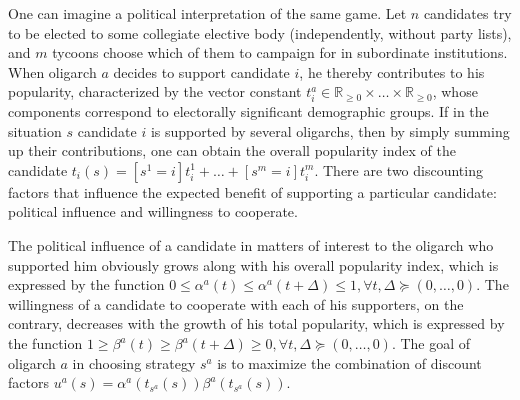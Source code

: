 One can imagine a political interpretation of the same game. Let $n$ candidates try to be elected to some collegiate elective body (independently, without party lists), and $m$ tycoons choose which of them to campaign for in subordinate institutions. When oligarch $a$ decides to support candidate $i$, he thereby contributes to his popularity, characterized by the vector constant $t_i^a \in \mathbb{R}_{\ge 0} \times \ldots \times \mathbb{R}_{\ge 0}$, whose components correspond to electorally significant demographic groups. If in the situation $s$ candidate $i$ is supported by several oligarchs, then by simply summing up their contributions, one can obtain the overall popularity index of the candidate $t_i(s) = [s^1 = i] t_i^1 + \ldots + [s^m = i] t_i^m$. There are two discounting factors that influence the expected benefit of supporting a particular candidate: political influence and willingness to cooperate. %

The political influence of a candidate in matters of interest to the oligarch who supported him obviously grows along with his overall popularity index, which is expressed by the function $0 \le \alpha^a(t) \le \alpha^a(t + \Delta) \le 1, \forall t, \Delta \succeq (0, \ldots, 0)$. The willingness of a candidate to cooperate with each of his supporters, on the contrary, decreases with the growth of his total popularity, which is expressed by the function $1 \ge \beta^a(t) \ge \beta^a(t + \Delta) \ge 0, \forall t, \Delta \succeq (0, \ldots, 0)$. The goal of oligarch $a$ in choosing strategy $s^a$ is to maximize the combination of discount factors $u^a(s) = \alpha^a(t_{s^a}(s)) \beta^a(t_{s^ a}(s))$. %

